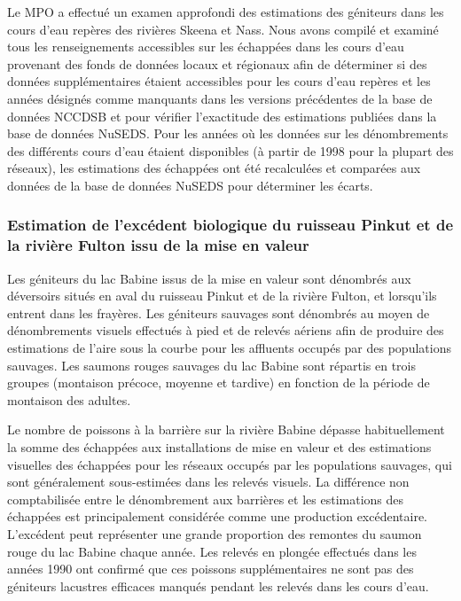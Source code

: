 \documentclass[french,11pt]{book}
\begin{document}
Le MPO a effectué un examen approfondi des estimations des géniteurs dans les cours d'eau repères des rivières Skeena et Nass. Nous avons compilé et examiné tous les renseignements accessibles sur les échappées dans les cours d'eau provenant des fonds de données locaux et régionaux afin de déterminer si des données supplémentaires étaient accessibles pour les cours d'eau repères et les années désignés comme manquants dans les versions précédentes de la base de données NCCDSB et pour vérifier l'exactitude des estimations publiées dans la base de données NuSEDS. Pour les années où les données sur les dénombrements des différents cours d'eau étaient disponibles (à partir de 1998 pour la plupart des réseaux), les estimations des échappées ont été recalculées et comparées aux données de la base de données NuSEDS pour déterminer les écarts.

\clearpage

\subsubsection{Estimation de l'excédent biologique du ruisseau Pinkut et de la rivière Fulton issu de la mise en valeur}\label{SurplusEst}

Les géniteurs du lac Babine issus de la mise en valeur sont dénombrés aux déversoirs situés en aval du ruisseau Pinkut et de la rivière Fulton, et lorsqu'ils entrent dans les frayères. Les géniteurs sauvages sont dénombrés au moyen de dénombrements visuels effectués à pied et de relevés aériens afin de produire des estimations de l'aire sous la courbe pour les affluents occupés par des populations sauvages. Les saumons rouges sauvages du lac Babine sont répartis en trois groupes (montaison précoce, moyenne et tardive) en fonction de la période de montaison des adultes.

Le nombre de poissons à la barrière sur la rivière Babine dépasse habituellement la somme des échappées aux installations de mise en valeur et des estimations visuelles des échappées pour les réseaux occupés par les populations sauvages, qui sont généralement sous-estimées dans les relevés visuels. La différence non comptabilisée entre le dénombrement aux barrières et les estimations des échappées est principalement considérée comme une production excédentaire. L'excédent peut représenter une grande proportion des remontes du saumon rouge du lac Babine chaque année. Les relevés en plongée effectués dans les années 1990 ont confirmé que ces poissons supplémentaires ne sont pas des géniteurs lacustres efficaces manqués pendant les relevés dans les cours d'eau.
\end{document}
